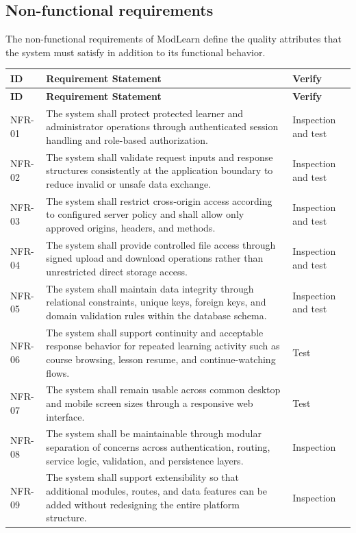 \subsection{Non-functional requirements}

The non-functional requirements of ModLearn define the quality attributes that the system must satisfy in addition to its functional behavior.

\begin{longtable}{L{1.7cm}L{10.1cm}L{2.0cm}}
\toprule
\textbf{ID} & \textbf{Requirement Statement} & \textbf{Verify} \\
\midrule
\endfirsthead
\toprule
\textbf{ID} & \textbf{Requirement Statement} & \textbf{Verify} \\
\midrule
\endhead
\bottomrule
\endfoot
NFR-01 & The system shall protect protected learner and administrator operations through authenticated session handling and role-based authorization. & Inspection and test \\
NFR-02 & The system shall validate request inputs and response structures consistently at the application boundary to reduce invalid or unsafe data exchange. & Inspection and test \\
NFR-03 & The system shall restrict cross-origin access according to configured server policy and shall allow only approved origins, headers, and methods. & Inspection and test \\
NFR-04 & The system shall provide controlled file access through signed upload and download operations rather than unrestricted direct storage access. & Inspection and test \\
NFR-05 & The system shall maintain data integrity through relational constraints, unique keys, foreign keys, and domain validation rules within the database schema. & Inspection and test \\
NFR-06 & The system shall support continuity and acceptable response behavior for repeated learning activity such as course browsing, lesson resume, and continue-watching flows. & Test \\
NFR-07 & The system shall remain usable across common desktop and mobile screen sizes through a responsive web interface. & Test \\
NFR-08 & The system shall be maintainable through modular separation of concerns across authentication, routing, service logic, validation, and persistence layers. & Inspection \\
NFR-09 & The system shall support extensibility so that additional modules, routes, and data features can be added without redesigning the entire platform structure. & Inspection \\

\end{longtable}
